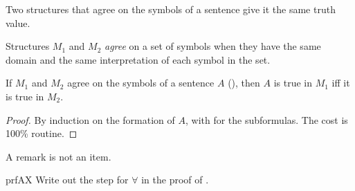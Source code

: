 \documentclass[../../../include/open-logic-section]{subfiles}
\begin{document}


Two structures that agree on the symbols of a sentence give it the same
truth value. %

\begin{defn}[Agreement]
Structures $M_1$ and $M_2$ \emph{agree} on a set of symbols when they have
the same domain and the same interpretation of each symbol in the set.
\end{defn}

\begin{prop}[Extensionality]
If $M_1$ and $M_2$ agree on the symbols of a sentence $A$
(), then $A$ is true in $M_1$ iff it is true in $M_2$.
\end{prop}

\begin{proof}
By induction on the formation of $A$, with 
for the subformulas. The cost is 100\% routine.
\end{proof}

\begin{rem}
A remark is not an item.
\end{rem}

\begin{probtag}{prfAX}
Write out the step for $\forall$ in the proof of
.
\end{probtag}
\end{document}
